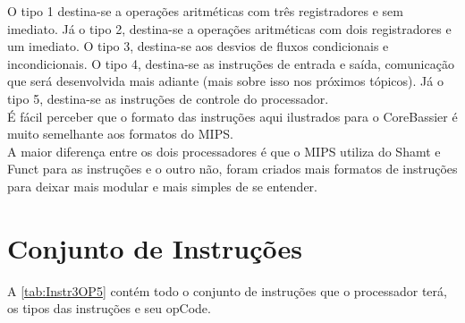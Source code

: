 \documentclass[
	12pt,
	openright,
	a4paper,
	english,			
	french,				
	spanish,			
	brazil,				
	]{abntex2}
\begin{document}
O tipo 1 destina-se a operações aritméticas com três registradores e sem imediato. Já o tipo 2, destina-se a operações aritméticas com dois registradores e um imediato. O tipo 3, destina-se aos desvios de fluxos condicionais e incondicionais. O tipo 4, destina-se as instruções de entrada e saída, comunicação que será desenvolvida mais adiante (mais sobre isso nos próximos tópicos). Já o tipo 5, destina-se as instruções de controle do processador.\\
É fácil perceber que o formato das instruções aqui ilustrados para o CoreBassier é muito semelhante aos formatos do MIPS.\\
A maior diferença entre os dois processadores é que o MIPS utiliza do Shamt e Funct para as instruções e o outro não, foram criados mais formatos de instruções para deixar mais modular e mais simples de se entender.

\section{Conjunto de Instruções}
A \autoref{tab:Instr3OP5} contém todo o conjunto de instruções que o processador terá, os tipos das instruções e seu opCode.
\end{document}
